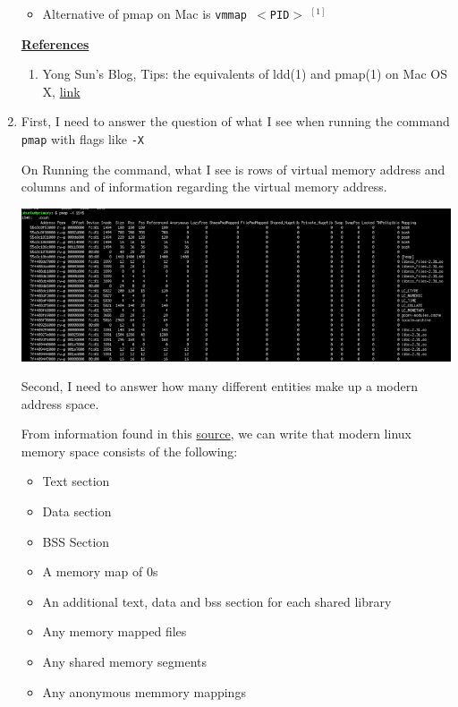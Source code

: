 \documentclass[12pt]{article}
\begin{document}
\begin{enumerate}[1.]
    \begin{itemize}
        \item Alternative of pmap on Mac is \texttt{vmmap $<$PID$>$} $^{[1]}$
    \end{itemize}

    \bigskip

    \underline{\textbf{References}}

    \begin{enumerate}[1)]
        \item Yong Sun's Blog, Tips: the equivalents of ldd(1) and pmap(1) on Mac OS X, \href{http://yongsun.me/2009/01/tips-the-equivalents-of-ldd1-and-pmap1-on-mac-os-x/}{link}
    \end{enumerate}

    \item

    First, I need to answer the question of what I see when running the command
    \texttt{pmap} with flags like \texttt{-X}

    \bigskip

    On Running the command, what I see is rows of virtual memory address and columns and of
    information regarding the virtual memory address.

    \bigskip

    \begin{center}
    \includegraphics[width=\linewidth]{images/worksheet_6_solution_6.png}
    \end{center}

    \bigskip

    Second, I need to answer how many different entities make up a modern address space.

    \bigskip

    From information found in this \href{http://books.gigatux.nl/mirror/kerneldevelopment/0672327201/ch14.html}{source},
    we can write that modern linux memory space consists of the following:

    \begin{itemize}
        \item Text section
        \item Data section
        \item BSS Section
        \item A memory map of 0s
        \item An additional text, data and bss section for each shared library
        \item Any memory mapped files
        \item Any shared memory segments
        \item Any anonymous memmory mappings
    \end{itemize}


\end{enumerate}
\end{document}
